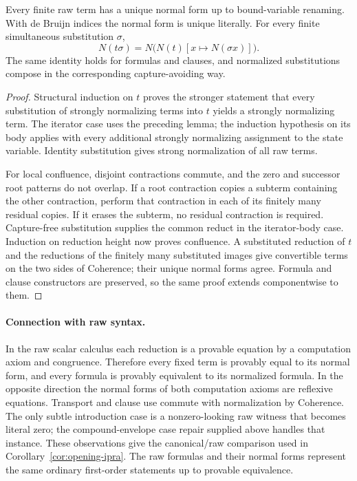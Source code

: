 \begin{theorem}
Every finite raw term has a unique normal form up to bound-variable
renaming. With de Bruijn indices the normal form is unique literally.
For every finite simultaneous substitution $\sigma$,
\[
 N(t\sigma)=N\bigl(N(t)[x\mapsto N(\sigma x)]\bigr).
 \tag{Coherence}
\]
The same identity holds for formulas and clauses, and normalized
substitutions compose in the corresponding capture-avoiding way.
\end{theorem}
\begin{proof}
Structural induction on $t$ proves the stronger statement that every
substitution of strongly normalizing terms into $t$ yields a strongly
normalizing term. The iterator case uses the preceding lemma; the
induction hypothesis on its body applies with every additional strongly
normalizing assignment to the state variable. Identity substitution gives
strong normalization of all raw terms.

For local confluence, disjoint contractions commute, and the zero and
successor root patterns do not overlap. If a root contraction copies a
subterm containing the other contraction, perform that contraction in
each of its finitely many residual copies. If it erases the subterm,
no residual contraction is required. Capture-free substitution supplies
the common reduct in the iterator-body case. Induction on reduction
height now proves confluence. A substituted reduction of $t$ and the
reductions of the finitely many substituted images give convertible
terms on the two sides of Coherence; their unique normal forms agree.
Formula and clause constructors are preserved, so the same proof extends
componentwise to them.
\end{proof}

\paragraph{Connection with raw syntax.}
In the raw scalar calculus each reduction is a provable equation by a
computation axiom and congruence. Therefore every fixed term is provably
equal to its normal form, and every formula is provably equivalent to
its normalized formula. In the opposite direction the normal forms of
both computation axioms are reflexive equations. Transport and clause
use commute with normalization by Coherence. The only subtle introduction
case is a nonzero-looking raw witness that becomes literal zero; the
compound-envelope case repair supplied above handles that instance.
These observations give the canonical/raw comparison used in
Corollary~\ref{cor:opening-ipra}. The raw formulas and their normal forms
represent the same ordinary first-order statements up to provable
equivalence.

